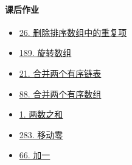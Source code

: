 \paragraph{课后作业}

\begin{itemize}
  \item \hyperref[leetcode:26]{26. 删除排序数组中的重复项}
  \item \hyperref[leetcode:189]{189. 旋转数组}
  \item \hyperref[leetcode:21]{21. 合并两个有序链表}
  \item \hyperref[leetcode:88]{88. 合并两个有序数组}
  \item \hyperref[leetcode:1]{1. 两数之和}
  \item \hyperref[leetcode:283]{283. 移动零}
  \item \hyperref[leetcode:66]{66. 加一}
\end{itemize}
